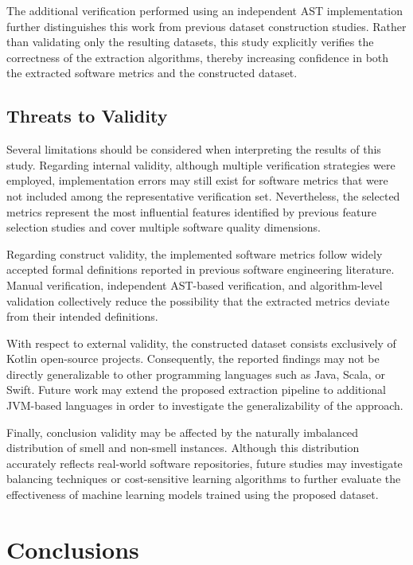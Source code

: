 \documentclass[]{einformatica}
\begin{document}
The additional verification performed using an independent AST implementation further distinguishes this work from previous dataset construction studies. Rather than validating only the resulting datasets, this study explicitly verifies the correctness of the extraction algorithms, thereby increasing confidence in both the extracted software metrics and the constructed dataset.

\subsection{Threats to Validity}

Several limitations should be considered when interpreting the results of this study. Regarding internal validity, although multiple verification strategies were employed, implementation errors may still exist for software metrics that were not included among the representative verification set. Nevertheless, the selected metrics represent the most influential features identified by previous feature selection studies and cover multiple software quality dimensions.

Regarding construct validity, the implemented software metrics follow widely accepted formal definitions reported in previous software engineering literature. Manual verification, independent AST-based verification, and algorithm-level validation collectively reduce the possibility that the extracted metrics deviate from their intended definitions.

With respect to external validity, the constructed dataset consists exclusively of Kotlin open-source projects. Consequently, the reported findings may not be directly generalizable to other programming languages such as Java, Scala, or Swift. Future work may extend the proposed extraction pipeline to additional JVM-based languages in order to investigate the generalizability of the approach.

Finally, conclusion validity may be affected by the naturally imbalanced distribution of smell and non-smell instances. Although this distribution accurately reflects real-world software repositories, future studies may investigate balancing techniques or cost-sensitive learning algorithms to further evaluate the effectiveness of machine learning models trained using the proposed dataset.


\section{Conclusions}\label{sec:Conclusions}
\end{document}
